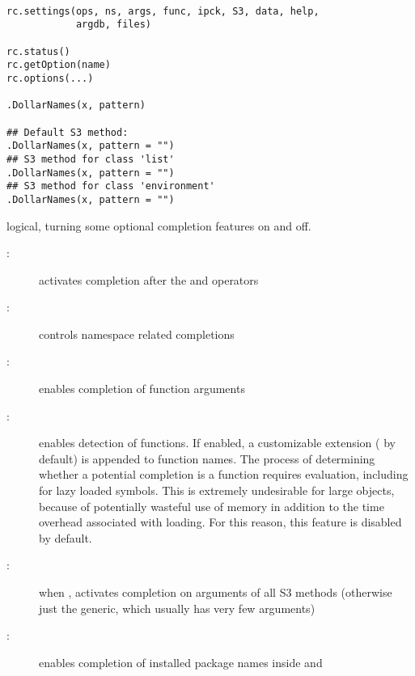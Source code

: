 %
\begin{Usage}
\begin{verbatim}

rc.settings(ops, ns, args, func, ipck, S3, data, help,
            argdb, files)

rc.status()
rc.getOption(name)
rc.options(...)

.DollarNames(x, pattern)

## Default S3 method:
.DollarNames(x, pattern = "")
## S3 method for class 'list'
.DollarNames(x, pattern = "")
## S3 method for class 'environment'
.DollarNames(x, pattern = "")

\end{verbatim}
\end{Usage}
%
\begin{Arguments}
\begin{ldescription}
\item[\code{ops, ns, args, func, ipck, S3, data, help, argdb, files}] 

logical, turning some optional completion features on and off.

\begin{description}

\item[:] activates completion after the \code{\$} and
 operators

\item[:] controls namespace related completions

\item[:] enables completion of function arguments

\item[:] enables detection of functions.  If enabled,
a customizable extension ( by default) is appended to
function names.  The process of determining whether a potential
completion is a function requires evaluation, including for lazy
loaded symbols.  This is extremely undesirable for large
objects, because of potentially wasteful use of memory in
addition to the time overhead associated with loading.  For this
reason, this feature is disabled by default. 

\item[:]  when , activates completion on
arguments of all S3 methods (otherwise just the generic, which
usually has very few arguments) 

\item[:]  enables completion of installed package names
inside  and  


\end{description}
\end{ldescription}
\end{Arguments}

